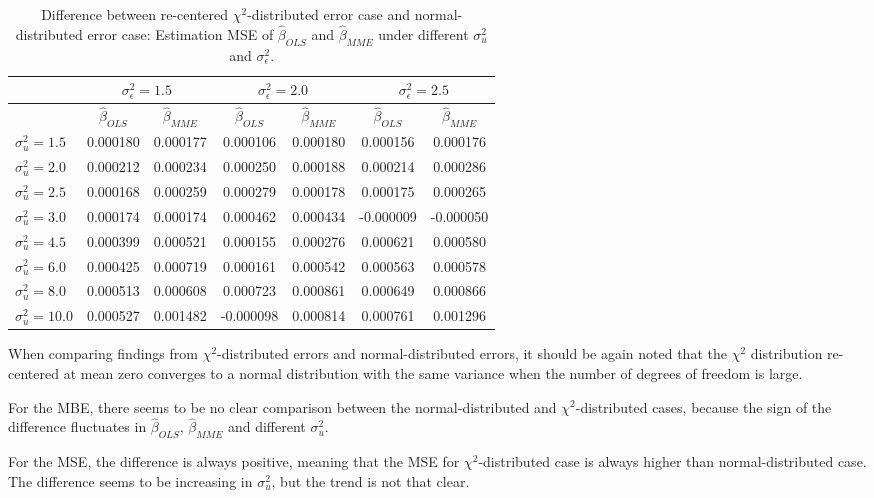 \documentclass{article}
\begin{document}
\begin{table}[ht]
    \centering
    \caption{Difference between re-centered $\chi^2$-distributed error case and normal-distributed error case: Estimation MSE of $\hat{\beta}_{OLS}$ and $\hat{\beta}_{MME}$ under different $\sigma^2_u$ and $\sigma^2_\epsilon$.}
    \label{Tab:MSE_diff_chi_normal}
    \begin{tabular}[t]{lcccccc}
        \hline
        &\multicolumn{2}{c}{$\sigma^2_\epsilon=1.5$}&\multicolumn{2}{c}{$\sigma^2_\epsilon=2.0$}&\multicolumn{2}{c}{$\sigma^2_\epsilon=2.5$}\\
        \hline
        &$\hat{\beta}_{OLS}$&$\hat{\beta}_{MME}$&$\hat{\beta}_{OLS}$&$\hat{\beta}_{MME}$&$\hat{\beta}_{OLS}$&$\hat{\beta}_{MME}$\\
        \hline
        $\sigma^2_u = 1.5$&0.000180&0.000177&0.000106&0.000180&0.000156&0.000176\\
        $\sigma^2_u = 2.0$&0.000212&0.000234&0.000250&0.000188&0.000214&0.000286\\
        $\sigma^2_u = 2.5$&0.000168&0.000259&0.000279&0.000178&0.000175&0.000265\\
        $\sigma^2_u = 3.0$&0.000174&0.000174&0.000462&0.000434&-0.000009&-0.000050\\
        $\sigma^2_u = 4.5$&0.000399&0.000521&0.000155&0.000276&0.000621&0.000580\\
        $\sigma^2_u = 6.0$&0.000425&0.000719&0.000161&0.000542&0.000563&0.000578\\
        $\sigma^2_u = 8.0$&0.000513&0.000608&0.000723&0.000861&0.000649&0.000866\\
        $\sigma^2_u = 10.0$&0.000527&0.001482&-0.000098&0.000814&0.000761&0.001296\\
        \hline
    \end{tabular}
\end{table}

When comparing findings from $\chi^2$-distributed errors and normal-distributed errors, it should be again noted that
the $\chi^2$ distribution re-centered at mean zero converges to a normal distribution with the same variance when the number of degrees of freedom is large.

For the MBE, there seems to be no clear comparison between the normal-distributed and $\chi^2$-distributed cases,
because the sign of the difference fluctuates in $\hat{\beta}_{OLS}$, $\hat{\beta}_{MME}$ and different $\sigma^2_u$.

For the MSE, the difference is always positive, meaning that the MSE for $\chi^2$-distributed case is always higher than normal-distributed case.
The difference seems to be increasing in $\sigma^2_u$, but the trend is not that clear. 
\end{document}
